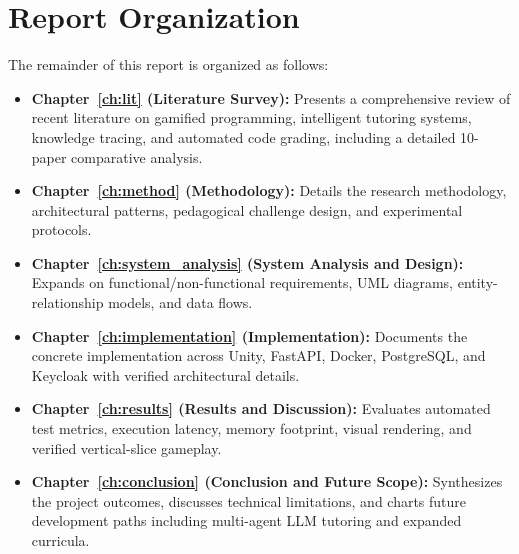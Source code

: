 \section{Report Organization}
The remainder of this report is organized as follows:
\begin{itemize}
    \item \textbf{Chapter~\ref{ch:lit} (Literature Survey):} Presents a comprehensive review of recent literature on gamified programming, intelligent tutoring systems, knowledge tracing, and automated code grading, including a detailed 10-paper comparative analysis.
    \item \textbf{Chapter~\ref{ch:method} (Methodology):} Details the research methodology, architectural patterns, pedagogical challenge design, and experimental protocols.
    \item \textbf{Chapter~\ref{ch:system_analysis} (System Analysis and Design):} Expands on functional/non-functional requirements, UML diagrams, entity-relationship models, and data flows.
    \item \textbf{Chapter~\ref{ch:implementation} (Implementation):} Documents the concrete implementation across Unity, FastAPI, Docker, PostgreSQL, and Keycloak with verified architectural details.
    \item \textbf{Chapter~\ref{ch:results} (Results and Discussion):} Evaluates automated test metrics, execution latency, memory footprint, visual rendering, and verified vertical-slice gameplay.
    \item \textbf{Chapter~\ref{ch:conclusion} (Conclusion and Future Scope):} Synthesizes the project outcomes, discusses technical limitations, and charts future development paths including multi-agent LLM tutoring and expanded curricula.
\end{itemize}
